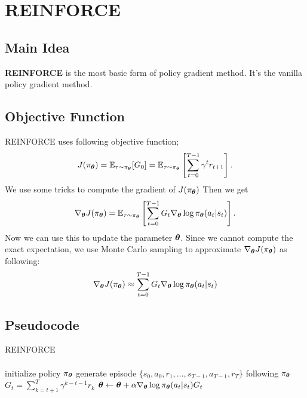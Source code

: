 \section{REINFORCE}
    \subsection{Main Idea}
        \textbf{REINFORCE} is the most basic form of policy gradient method.
        It's the vanilla policy gradient method.
    \subsection{Objective Function}
        REINFORCE uses following objective function;
        \begin{equation}
            J(\pi_{\boldsymbol{\theta}})=\mathbb{E}_{\tau \sim \pi_{\boldsymbol{\theta}}}[G_0] = \mathbb{E}_{\tau \sim \pi_{\boldsymbol{\theta}}}\left[ \sum_{t=0}^{T-1}\gamma^tr_{t+1} \right].
        \end{equation}
        We use some tricks to compute the gradient of $J(\pi_{\boldsymbol{\theta}})$
        Then we get
        \begin{equation}
            \nabla_{\boldsymbol{\theta}} J(\pi_{\boldsymbol{\theta}}) = \mathbb{E}_{\tau \sim \pi_{\boldsymbol{\theta}}}\left[ \sum_{t=0}^{T-1}G_t\nabla_{\boldsymbol{\theta}}\log{\pi_{\boldsymbol{\theta}}(a_t|s_t)} \right].
        \end{equation}
        Now we can use this to update the parameter ${\boldsymbol{\theta}}$. Since we cannot compute the exact expectation, we use Monte Carlo sampling
        to approximate $\nabla_{\boldsymbol{\theta}} J(\pi_{\boldsymbol{\theta}})$ as following:
        \begin{equation}
            \nabla_{\boldsymbol{\theta}} J(\pi_{\boldsymbol{\theta}}) \approx \sum_{t=0}^{T-1}G_t\nabla_{\boldsymbol{\theta}}\log{\pi_{\boldsymbol{\theta}}(a_t|s_t)}
        \end{equation}
    \subsection{Pseudocode}
        {REINFORCE}
        {
             \\
             \\
        }
        {
        }
        {
            initialize policy $\pi_\param$\;
            {
                generate episode $\{s_0,a_0,r_1,\dots,s_{T-1},a_{T-1},r_{T}\}$ following $\pi_\param$\;
                {
                    $G_t=\sum_{k=t+1}^{T} \gamma^{k-t-1}r_k$\;
                    ${\boldsymbol{\theta}} \leftarrow {\boldsymbol{\theta}} + \alpha\nabla_{\boldsymbol{\theta}}\log{\pi_{\boldsymbol{\theta}}(a_t|s_t)}G_t$\;
                }
            }
            \Return{$\pi_\param$}
        }
